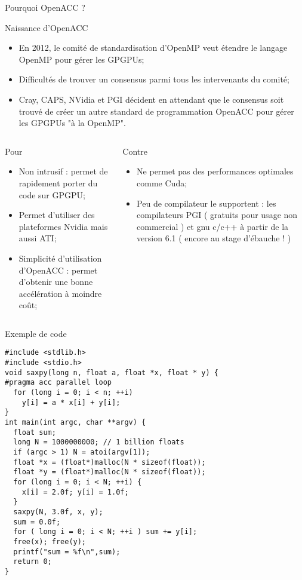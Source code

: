 \documentclass[handout,francais]{beamer}
\begin{document}
\begin{frame}[fragile]{Pourquoi OpenACC ?}
\scriptsize
\begin{block}{Naissance d'OpenACC}
\begin{itemize}
\item En 2012, le comité de standardisation d'OpenMP veut étendre le langage
OpenMP pour gérer les GPGPUs;
\item Difficultés de trouver un consensus parmi tous les intervenants du comité;
\item Cray, CAPS, NVidia et PGI décident en attendant que le consensus soit trouvé
de créer un autre standard de programmation OpenACC pour gérer les GPGPUs "à la
OpenMP".
\end{itemize}
\end{block}
\begin{columns}
\begin{column}{0.5\textwidth}
\begin{exampleblock}{Pour}
\begin{itemize}
\item Non intrusif : permet de rapidement porter du code sur GPGPU;
\item Permet d'utiliser des plateformes Nvidia mais aussi ATI;
\item Simplicité d'utilisation d'OpenACC : permet d'obtenir une bonne
accélération à moindre coût;
\end{itemize}
\end{exampleblock}
\end{column}
\begin{column}{0.5\textwidth}
\begin{alertblock}{Contre}
\begin{itemize}
\item Ne permet pas des performances optimales comme Cuda;
\item Peu de compilateur le supportent : les compilateurs PGI ( gratuits
pour usage non commercial ) et gnu c/c++ à partir de la version 6.1 ( encore
au stage d'ébauche ! )
\end{itemize}
\end{alertblock}
\end{column}
\end{columns}
\end{frame}

\begin{frame}[fragile]{Exemple de code}
\scriptsize
\begin{lstlisting}
#include <stdlib.h>
#include <stdio.h>
void saxpy(long n, float a, float *x, float * y) {
#pragma acc parallel loop
  for (long i = 0; i < n; ++i)
    y[i] = a * x[i] + y[i];
}
int main(int argc, char **argv) {
  float sum;
  long N = 1000000000; // 1 billion floats
  if (argc > 1) N = atoi(argv[1]);
  float *x = (float*)malloc(N * sizeof(float));
  float *y = (float*)malloc(N * sizeof(float));
  for (long i = 0; i < N; ++i) {
    x[i] = 2.0f; y[i] = 1.0f;
  }
  saxpy(N, 3.0f, x, y);
  sum = 0.0f;
  for ( long i = 0; i < N; ++i ) sum += y[i];
  free(x); free(y);
  printf("sum = %f\n",sum);
  return 0;
}
\end{lstlisting}
\end{frame}
\end{document}
